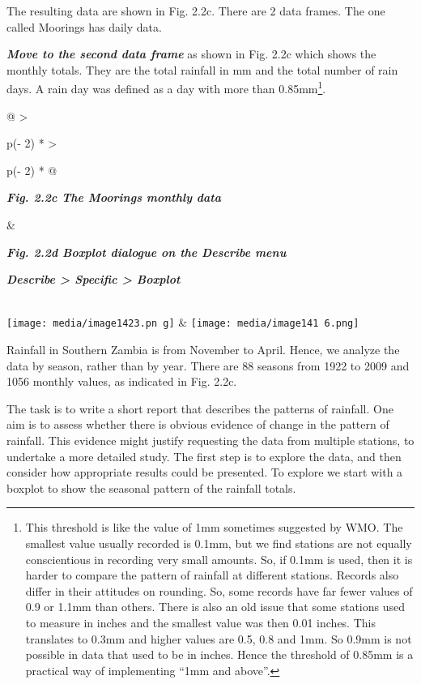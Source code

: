 \documentclass[
  letterpaper,
  DIV=11,
  numbers=noendperiod]{scrreprt}
\begin{document}
The resulting data are shown in Fig. 2.2c. There are 2 data frames. The
one called Moorings has daily data.

\textbf{\emph{Move to the second data frame}} as shown in Fig. 2.2c
which shows the monthly totals. They are the total rainfall in mm and
the total number of rain days. A rain day was defined as a day with more
than 0.85mm\footnote{This threshold is like the value of 1mm sometimes
  suggested by WMO. The smallest value usually recorded is 0.1mm, but we
  find stations are not equally conscientious in recording very small
  amounts. So, if 0.1mm is used, then it is harder to compare the
  pattern of rainfall at different stations. Records also differ in
  their attitudes on rounding. So, some records have far fewer values of
  0.9 or 1.1mm than others. There is also an old issue that some
  stations used to measure in inches and the smallest value was then
  0.01 inches. This translates to 0.3mm and higher values are 0.5, 0.8
  and 1mm. So 0.9mm is not possible in data that used to be in inches.
  Hence the threshold of 0.85mm is a practical way of implementing ``1mm
  and above''.}.

\begin{longtable}[]{@{}
  >{\raggedright\arraybackslash}p{(\columnwidth - 2\tabcolsep) * }
  >{\raggedright\arraybackslash}p{(\columnwidth - 2\tabcolsep) * }@{}}
\toprule\noalign{}
\begin{minipage}[b]{\linewidth}\raggedright
\textbf{\emph{Fig. 2.2c The Moorings monthly data}}
\end{minipage} & \begin{minipage}[b]{\linewidth}\raggedright
\textbf{\emph{Fig. 2.2d Boxplot dialogue on the Describe menu}}

\textbf{\emph{Describe \textgreater{} Specific \textgreater{} Boxplot}}
\end{minipage} \\
\midrule\noalign{}
\endhead
\bottomrule\noalign{}
\endlastfoot
\texttt{[image: media/image1423.pn g]}
&
\texttt{[image: media/image141 6.png]} \\
\end{longtable}

Rainfall in Southern Zambia is from November to April. Hence, we analyze
the data by season, rather than by year. There are 88 seasons from 1922
to 2009 and 1056 monthly values, as indicated in Fig. 2.2c.

The task is to write a short report that describes the patterns of
rainfall. One aim is to assess whether there is obvious evidence of
change in the pattern of rainfall. This evidence might justify
requesting the data from multiple stations, to undertake a more detailed
study. The first step is to explore the data, and then consider how
appropriate results could be presented. To explore we start with a
boxplot to show the seasonal pattern of the rainfall totals.
\end{document}
